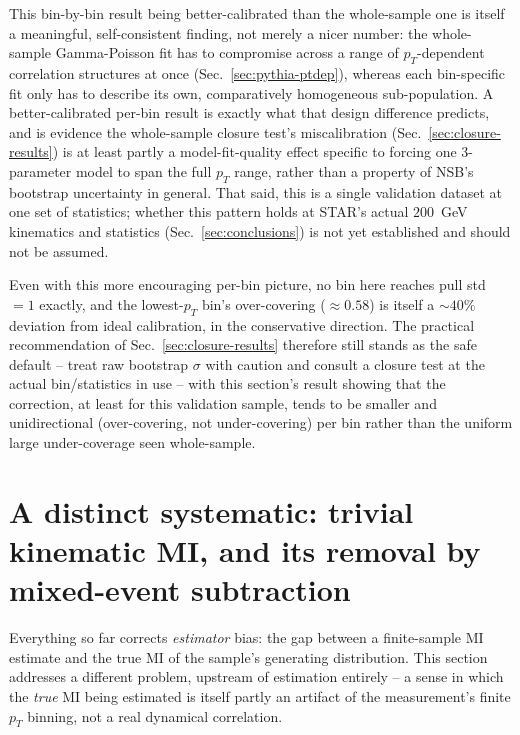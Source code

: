 \documentclass[11pt]{article}
\begin{document}
This bin-by-bin result being better-calibrated than the whole-sample one
is itself a meaningful, self-consistent finding, not merely a nicer
number: the whole-sample Gamma-Poisson fit has to compromise across a
range of $p_T$-dependent correlation structures at once
(Sec.~\ref{sec:pythia-ptdep}), whereas each bin-specific fit only has to
describe its own, comparatively homogeneous sub-population. A
better-calibrated per-bin result is exactly what that design difference
predicts, and is evidence the whole-sample closure test's miscalibration
(Sec.~\ref{sec:closure-results}) is at least partly a model-fit-quality
effect specific to forcing one 3-parameter model to span the full $p_T$
range, rather than a property of NSB's bootstrap uncertainty in general.
That said, this is a single validation dataset at one set of statistics;
whether this pattern holds at STAR's actual $200$~GeV kinematics and
statistics (Sec.~\ref{sec:conclusions}) is not yet established and should
not be assumed.

Even with this more encouraging per-bin picture, no bin here reaches
pull std $=1$ exactly, and the lowest-$p_T$ bin's over-covering
($\approx0.58$) is itself a $\sim\!40\%$ deviation from ideal calibration,
in the conservative direction. The practical recommendation of
Sec.~\ref{sec:closure-results} therefore still stands as the safe default
-- treat raw bootstrap $\sigma$ with caution and consult a closure test
at the actual bin/statistics in use -- with this section's result showing
that the correction, at least for this validation sample, tends to be
smaller and unidirectional (over-covering, not under-covering) per bin
rather than the uniform large under-coverage seen whole-sample.

\section{A distinct systematic: trivial kinematic MI, and its removal by
mixed-event subtraction}
\label{sec:mixed}

Everything so far corrects \emph{estimator} bias: the gap between a
finite-sample MI estimate and the true MI of the sample's generating
distribution. This section addresses a different problem, upstream of
estimation entirely -- a sense in which the \emph{true} MI being
estimated is itself partly an artifact of the measurement's finite
$p_T$ binning, not a real dynamical correlation.
\end{document}
